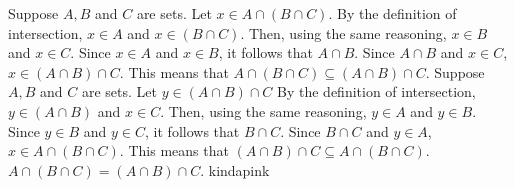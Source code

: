 


\sbseteqpf
    {Suppose $A,B$ and $C$ are sets. Let $x\in A\cap (B\cap C)$. By the definition of intersection, $x\in A$ and $x\in (B\cap C)$. Then, using the same reasoning, $x\in B$ and $x \in C$. Since $x\in A$ and $x\in B$, it follows that $A\cap B$. Since $A\cap B$ and $x\in C$, $x\in (A\cap B) \cap C$. This means that $A\cap (B\cap C) \subseteq (A\cap B) \cap C$.}
    {Suppose $A,B$ and $C$ are sets. Let $y\in (A\cap B)\cap C$ By the definition of intersection, $y\in (A\cap B)$ and $x\in C$. Then, using the same reasoning, $y\in A$ and $y\in B$. Since $y\in B$ and $y\in C$, it follows that $B\cap C$. Since $B\cap C$ and $y\in A$, $x\in A \cap (B \cap C)$. This means that $(A\cap B)\cap C \subseteq A\cap (B \cap C)$.}
    {$A\cap (B\cap C) = (A\cap B) \cap C$.}
    {kindapink}

\newpage






